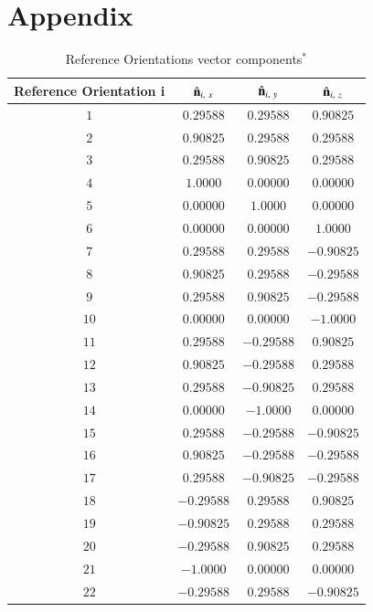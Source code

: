 \documentclass[final, 3p]{elsarticle}
\begin{document}
\section*{Appendix}
\setcounter{table}{0}
\renewcommand{\thetable}{A\arabic{table}}
\label{sec:App1}
\begin{table}[h]
	\label{tab:A1}
	\begin{center}
		\caption{Reference Orientations vector components$^*$}
		\begin{tabular}{|c|c|c|c|}
			\hline\hline
			Reference Orientation i & $\hat{\bf n}_{i,\ x}$ &  $\hat{\bf n}_{i,\ y}$ &  $\hat{\bf n}_{i,\ z}$ \\
			\hline
			$1$ & $ 0.29588$ &  $ 0.29588$ & $ 0.90825$ \\
			$2$ & $ 0.90825$ &  $ 0.29588$ & $ 0.29588$ \\
			$3$ & $ 0.29588$ &  $ 0.90825$ & $ 0.29588$ \\
			$4$ & $1.0000$ &  $0.00000$ & $0.00000$ \\
			$5$ & $0.00000$ &  $1.0000$ & $0.00000$ \\
			$6$ & $0.00000$ &  $0.00000$ & $1.0000$ \\
			$7$ & $ 0.29588$ &  $ 0.29588$ & $-0.90825$ \\
			$8$ & $ 0.90825$ &  $ 0.29588$ & $-0.29588$ \\
			$9$ & $ 0.29588$ &  $ 0.90825$ & $-0.29588$ \\
			$10$ & $0.00000$ &  $0.00000$ & $-1.0000$ \\
			$11$ & $ 0.29588$ &  $-0.29588$ & $ 0.90825$ \\
			$12$ & $ 0.90825$ &  $-0.29588$ & $ 0.29588$ \\
			$13$ & $ 0.29588$ &  $-0.90825$ & $ 0.29588$ \\
			$14$ & $0.00000$ &  $-1.0000$ & $0.00000$ \\
			$15$ & $ 0.29588$ &  $-0.29588$ & $-0.90825$ \\
			$16$ & $ 0.90825$ &  $-0.29588$ & $-0.29588$ \\
			$17$ & $ 0.29588$ &  $-0.90825$ & $-0.29588$ \\
			$18$ & $-0.29588$ &  $ 0.29588$ & $ 0.90825$ \\
			$19$ & $-0.90825$ &  $ 0.29588$ & $ 0.29588$ \\
			$20$ & $-0.29588$ &  $ 0.90825$ & $ 0.29588$ \\
			$21$ & $-1.0000$ &  $0.00000$ & $0.00000$ \\
			$22$ & $-0.29588$ &  $ 0.29588$ & $-0.90825$ \\

\end{tabular}
\end{center}
\end{table}
\end{document}

